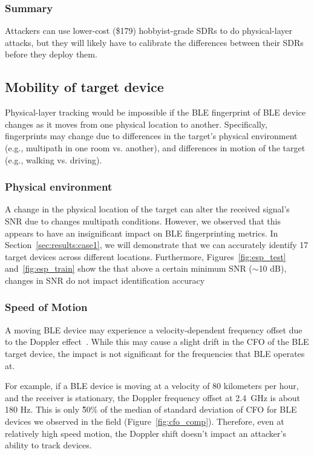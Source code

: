 \subsubsection*{Summary} Attackers can use lower-cost (\$179) hobbyist-grade
SDRs to do physical-layer attacks, but they will likely have to calibrate the
differences between their SDRs before they deploy them.

\subsection{Mobility of target device} %
\label{sec:hadi:mobility}

Physical-layer tracking would be impossible if the BLE fingerprint of BLE device
changes as it moves from one physical location to another.  Specifically,
fingerprints may change due to differences in the target's physical environment
(e.g., multipath in one room vs. another), and differences in
motion of the target (e.g., walking vs. driving).
    
\subsubsection*{Physical environment} A change in the physical location of the
target can alter the received signal's SNR due to changes
multipath conditions. However, we observed that this appears to have 
an insignificant impact on BLE fingerprinting metrics. In
Section~\ref{sec:results:case1}, we will demonstrate that we can accurately identify
17 target devices across different locations.
Furthermore,
%
Figures~\ref{fig:esp_test} and~\ref{fig:esp_train} show the that above a
certain minimum SNR ($\sim$10 dB), changes in SNR do not impact
identification accuracy

\subsubsection*{Speed of Motion} A moving BLE device may experience a
velocity-dependent frequency offset due to the Doppler
effect~\cite{nasadoppler}. While this may cause a slight drift in the CFO of
the BLE target device, the impact is not significant for the frequencies that
BLE operates at. 

For example, if a BLE device is moving at a velocity of 80
kilometers per hour,  and the receiver is stationary, the Doppler frequency
offset at 2.4~GHz is about 180 Hz. This is only \~50\% of the median of standard
deviation of CFO for BLE devices we observed in the field
(Figure~\ref{fig:cfo_comp}). Therefore, even at
relatively high speed motion, the Doppler shift doesn't impact an attacker's
ability to track devices.
    

